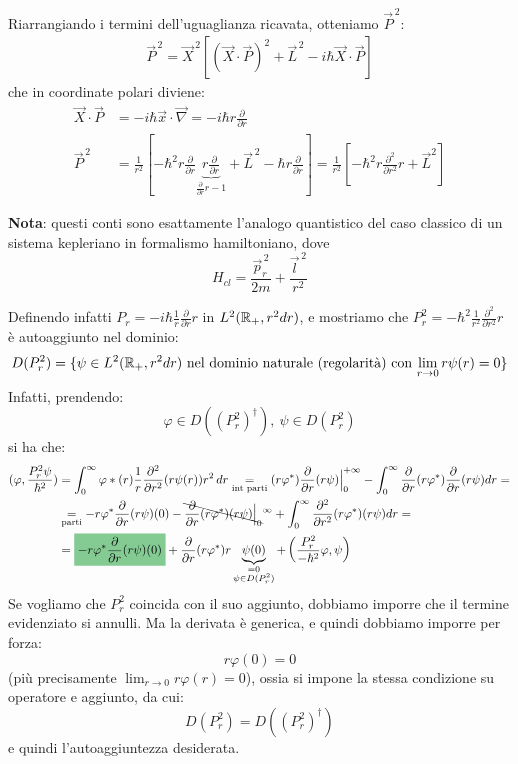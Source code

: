 \documentclass[../../FisicaTeorica.tex]{subfiles}
\begin{document}
Riarrangiando i termini dell'uguaglianza ricavata, otteniamo $\vec{P}^{\,2}$:
\begin{align*}
\vec{P}^{\,2} =\vec{X}^{\,2} [(\vec{X}\cdot \vec{P})^2+\vec{L}^{\,2}-i\hbar \vec{X}\cdot\vec{P}]
\end{align*}
che in coordinate polari diviene:
\begin{align*}
\vec{X}\cdot \vec{P} &= -i\hbar \vec{x}\cdot \vec{\nabla} = -i\hbar r \frac{\partial}{\partial r}\\
\vec{P}^{\,2} &= \frac{1}{r^2} \left[ -\hbar^2 r \frac{\partial}{\partial r} \underbrace{r \frac{\partial }{\partial r}}_{\frac{\partial}{\partial r} r -1} + \vec{L}^{\,2} - \hbar r \frac{\partial}{\partial r}\right]=\frac{1}{r^2}\left[-\hbar^2 r \frac{\partial^2}{\partial r^2}r + \vec{L}^2 \right]
\end{align*}

\textbf{Nota}: questi conti sono esattamente l'analogo quantistico del caso classico di un sistema kepleriano in formalismo hamiltoniano, dove
\[
H_{cl} = \frac{\vec{p}^{\,2}_r}{2m} + \frac{\vec{l}^{\,2}}{r^2}
\]

Definendo infatti $P_r = -i\hbar \frac{1}{r}\frac{\partial}{\partial r} r$ in $L^2(\mathbb{R}_+, r^2 dr)$, e mostriamo che $P_r^2 = -\hbar^2 \frac{1}{r^2} \frac{\partial^2}{\partial r^2} r$ è autoaggiunto nel dominio:
\[
D(P_r^2) = \{
\psi \in L^2(\mathbb{R}_+, r^2 dr) \text{ nel dominio naturale (regolarità) con $\lim_{r\to 0} r\psi(r)=0$}
\}
\]
Infatti, prendendo:
\[
\varphi \in D((P^2_r)^\dag), \> \psi \in D(P_r^2)
\]
si ha che:
\begin{align*}
(\varphi, \frac{P_r^2 \psi}{\hbar^2}) &=\int_0^\infty \varphi*(r) \frac{1}{r}\frac{\partial^2}{\partial r^2}(r\psi(r)) r^2\,dr \underset{\text{int parti}}{=}
(r\varphi^*)\frac{\partial}{\partial r}(r\psi)\Big|_{0}^{+\infty} - \int_0^{\infty}\frac{\partial}{\partial r}(r\varphi^*)\frac{\partial}{\partial r}(r\psi) dr =\\
&\underset{\text{parti}}{=}-r\varphi^* \frac{\partial}{\partial r}(r\psi)(0) - \bcancel{\frac{\partial}{\partial r}(r \varphi^*) (r\psi)\Big|_0}^{\infty} + \int_0^\infty \frac{\partial^2}{\partial r^2} (r\varphi^*) (r\psi) dr=\\
&=\hlc{ForestGreen}{-r\varphi^* \frac{\partial}{\partial r}(r\psi)(0)} + \frac{\partial}{\partial r}(r\varphi^*)r\underbrace{\psi(0)}_{\substack{=0\\\psi \in D(P_r^2)}} + \left(\frac{P^2_r}{-\hbar^2}\varphi, \psi\right)
\end{align*}
Se vogliamo che $P_r^2$ coincida con il suo aggiunto, dobbiamo imporre che il termine evidenziato si annulli. Ma la derivata è generica, e quindi dobbiamo imporre per forza:
\[
r\varphi(0) = 0
\]
(più precisamente $\lim_{r\to 0} r\varphi(r) = 0$), ossia si impone la stessa condizione su operatore e aggiunto, da cui:
\[
D(P_r^2) = D((P_r^2)^\dag)
\]
e quindi l'autoaggiuntezza desiderata.\\
\end{document}

